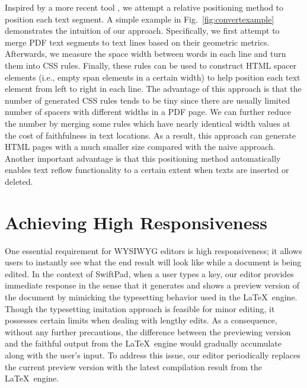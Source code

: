 \documentclass[]{sigchi}
\begin{document}
Inspired by a more recent tool \cite{wang2013online}, we attempt a relative positioning method to position each text segment. A simple example in Fig.~\ref{fig:convertexample} demonstrates the intuition of our approach. Specifically, we first attempt to merge PDF text segments to text lines based on their geometric metrics. Afterwards, we measure the space width between words in each line and turn them into CSS rules. Finally, these rules can be used to construct HTML spacer elements (i.e., empty span elements in a certain width) to help position each text element from left to right in each line.
The advantage of this approach is that the number of generated CSS rules tends to be tiny since there are usually limited number of spacers with different widths in a PDF page. We can further reduce the number by merging some rules which have nearly identical width values at the cost of faithfulness in text locations. As a result, this approach can generate HTML pages with a much smaller size compared with the naive approach. 
Another important advantage is that this positioning method automatically enables text reflow functionality to a certain extent when texts are inserted or deleted.  




\section{Achieving High Responsiveness}\label{sect:checkpoint}





One essential requirement for WYSIWYG editors is high responsiveness; it allows users to instantly see what the end result will look like while a document is being  edited. In the context of SwiftPad, when a user types a key, our editor provides immediate response in the sense that it generates and shows a preview version of the document by mimicking the typesetting behavior used in the \LaTeX\ engine. 
Though the typesetting imitation approach is feasible for minor editing, it possesses certain limits when dealing with lengthy edits.
As a consequence, without any further precautions, the difference between the previewing version and the faithful output from the \LaTeX\ engine would gradually accumulate along with the user's input. To address this issue, our editor periodically replaces the current preview version with the latest compilation result from the \LaTeX\ engine.
\end{document}
